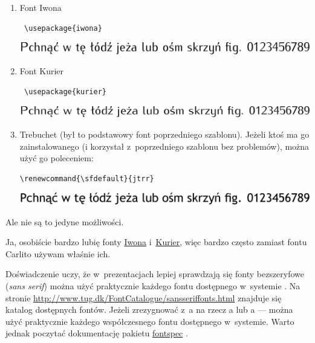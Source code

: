 \begin{frame}
\begin{enumerate}
  \item Font Iwona
        \begin{lstlisting}
 \usepackage{iwona}
\end{lstlisting}
        \includegraphics[width=.8\textwidth]{iwona}
  \item Font Kurier
        \begin{lstlisting}
 \usepackage{kurier}
\end{lstlisting}
        \includegraphics[width=.8\textwidth]{kurier}
  \item Trebuchet (był to podstawowy font poprzedniego szablonu).
        Jeżeli ktoś ma go zainstalowanego (i korzystał z~poprzedniego szablonu bez problemów), można użyć go poleceniem:
        \begin{lstlisting}
\renewcommand{\sfdefault}{jtrr}
\end{lstlisting}
        \includegraphics[width=.8\textwidth]{trebuchet}
 \end{enumerate}
 Ale nie są to jedyne możliwości.
\end{frame}

Ja, osobiście bardzo lubię fonty \href{https://www.ctan.org/pkg/iwona}{Iwona} i~\href{https://www.ctan.org/pkg/kurier}{Kurier}, więc bardzo często zamiast fontu Carlito używam właśnie ich.

Doświadczenie uczy, że w~prezentacjach lepiej sprawdzają się fonty bezszeryfowe (\emph{sans serif}) można użyć praktycznie każdego fontu dostępnego w~systemie . Na stronie \url{http://www.tug.dk/FontCatalogue/sansseriffonts.html} znajduje się katalog dostępnych fontów. Jeżeli zrezygnować z~a na rzecz a lub a — można użyć praktycznie każdego współczesnego fontu dostępnego w~systemie. Warto jednak poczytać dokumentację pakietu \href{https://ctan.org/pkg/fontspec}{fontspec} \cite{Fontspec}.

